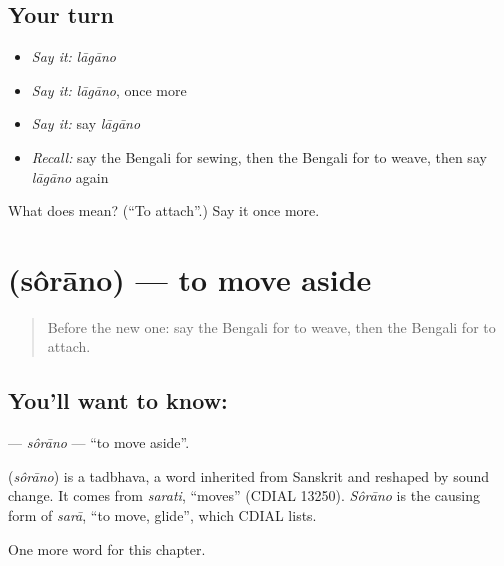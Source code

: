 \subsection*{Your turn}
\begin{itemize}
\raggedright
  \item \emph{Say it:} \emph{lāgāno}
  \item \emph{Say it:} \emph{lāgāno}, once more
  \item \emph{Say it:} say \emph{lāgāno}
  \item \emph{Recall:} say the Bengali for sewing, then the Bengali for to weave, then say \emph{lāgāno} again
\end{itemize}

\begin{tcolorbox}[breakable,colback=teal!4,colframe=teal!35!black,title={Before you move on}]
What does  mean? (\textquotedblleft{}To attach\textquotedblright{}.) Say it once more.
\end{tcolorbox}
\section[\texorpdfstring{\bn{সরানো} (sôrāno)}{সরানো (sôrāno)}]{ (sôrāno) — to move aside}

\label{lesson:BN-C102-sorano}



\begin{quote}
Before the new one: say the Bengali for to weave, then the Bengali for to attach.
\end{quote}

\subsection*{You'll want to know: }
\textbf{} — \emph{sôrāno} — \textquotedblleft{}to move aside\textquotedblright{}.

\begin{cousinweb}
\textbf{} (\emph{sôrāno}) is a tadbhava, a word inherited from Sanskrit and reshaped by sound change. It comes from \emph{sarati}, \textquotedblleft{}moves\textquotedblright{} (CDIAL 13250). \emph{Sôrāno} is the causing form of \emph{sarā}, \textquotedblleft{}to move, glide\textquotedblright{}, which CDIAL lists.
\end{cousinweb}

\begin{grammarlens}[title={What you've built}]
One more word for this chapter.
\end{grammarlens}

